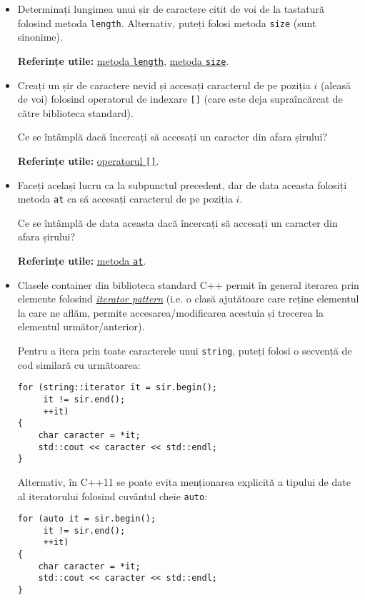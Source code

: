 \begin{enumerate}
\begin{itemize}
        \item Determinați lungimea unui șir de caractere citit de voi de la tastatură folosind metoda \texttt{length}. Alternativ, puteți folosi metoda \texttt{size} (sunt sinonime).

        \textbf{Referințe utile:} \href{https://cplusplus.com/reference/string/string/length/}{metoda \texttt{length}}, \href{https://cplusplus.com/reference/string/string/size/}{metoda \texttt{size}}.

        \item Creați un șir de caractere nevid și accesați caracterul de pe poziția \(i\) (aleasă de voi) folosind operatorul de indexare \texttt{[]} (care este deja supraîncărcat de către biblioteca standard).
        
        Ce se întâmplă dacă încercați să accesați un caracter din afara șirului?

        \textbf{Referințe utile:} \href{https://cplusplus.com/reference/string/string/operator[]/}{operatorul \texttt{[]}}.

        \item Faceți același lucru ca la subpunctul precedent, dar de data aceasta folosiți metoda \texttt{at} ca să accesați caracterul de pe poziția \(i\).
        
        Ce se întâmplă de data aceasta dacă încercați să accesați un caracter din afara șirului?

        \textbf{Referințe utile:} \href{https://cplusplus.com/reference/string/string/at/}{metoda \texttt{at}}.

        \item Clasele container din biblioteca standard C++ permit în general iterarea prin elemente folosind \href{https://en.wikipedia.org/wiki/Iterator_pattern}{\emph{iterator pattern}} (i.e. o clasă ajutătoare care reține elementul la care ne aflăm, permite accesarea/modificarea acestuia și trecerea la elementul următor/anterior).

        Pentru a itera prin toate caracterele unui \texttt{string}, puteți folosi o secvență de cod similară cu următoarea:
        \begin{lstlisting}   
for (string::iterator it = sir.begin();
     it != sir.end();
     ++it)
{
    char caracter = *it;
    std::cout << caracter << std::endl;
}
        \end{lstlisting}

        Alternativ, în C++11 se poate evita menționarea explicită a tipului de date al iteratorului folosind cuvântul cheie \texttt{auto}:
        \begin{lstlisting}   
for (auto it = sir.begin();
     it != sir.end();
     ++it)
{
    char caracter = *it;
    std::cout << caracter << std::endl;
}
        \end{lstlisting}


\end{itemize}
\end{enumerate}
